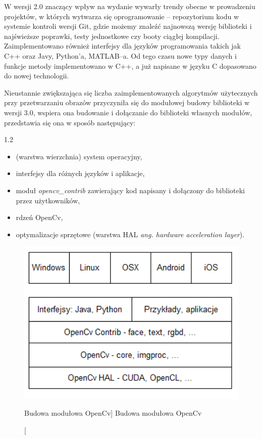 \documentclass[a4paper,12pt]{article}
\newcommand\spacingInSolemnItemize{1.2}
\begin{document}
			 W wersji 2.0 znaczący wpływ na wydanie wywarły trendy obecne w prowadzeniu projektów, w których wytwarza się oprogramowanie -- repozytorium kodu
				w systemie kontroli wersji Git, gdzie możemy znaleźć najnowszą wersję biblioteki i najświeższe poprawki, testy jednostkowe czy booty ciągłej kompilacji. 
				Zaimplementowano również interfejsy dla języków programowania takich jak C++ oraz Javy, Python’a, MATLAB--a. Od tego czasu nowe typy danych 
				i funkcje metody implementowano w C++, a już napisane w języku C dopasowano do nowej technologii. 
			
			Nieustannie zwiększająca się liczba zaimplementowanych algorytmów użytecznych przy przetwarzaniu obrazów przyczyniła się do modułowej budowy 
				biblioteki w wersji 3.0, wspiera ona budowanie i dołączanie do biblioteki własnych modułów, przedstawia się ona w sposób następujący:
                
                \begin{spacing}{\spacingInSolemnItemize}
    				\begin{itemize}
    					\item (warstwa wierzchnia) system operacyjny,
    					\item interfejsy dla różnych języków i aplikacje,
    					
    					
    					\item moduł \textit {opencv\_contrib} zawierający kod napisany i dołączony do biblioteki przez użytkowników,
    					\item rdzeń OpenCv,
    					\item optymalizacje sprzętowe (warstwa HAL \textit {ang. hardware acceleration layer}).
    				\end{itemize} 
                \end{spacing}
            
				\begin{figure}[!ht]  
					\begin{center}
						\includegraphics[width=12cm] {image//openCvBudowa.png} 
					\end{center}
					\caption
					    [Budowa modułowa OpenCv]
					    {Budowa modułowa OpenCv}
				\end{figure}
\end{document}
